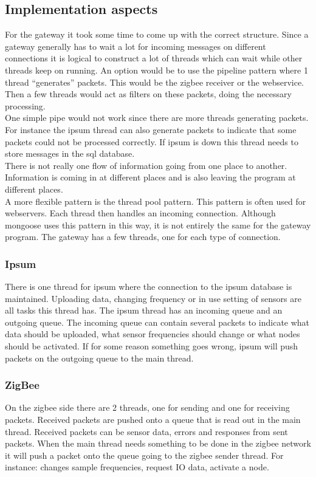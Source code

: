 \subsection{Implementation aspects}
For the gateway it took some time to come up with the correct structure. Since a gateway generally has to wait a lot for incoming messages on different connections it is logical to construct a lot of threads which can wait while other threads keep on running. An option would be to use the pipeline pattern where 1 thread “generates” packets. This would be the zigbee receiver or the webservice. Then a few threads would act as filters on these packets, doing the necessary processing.\\
One simple pipe would not work since there are more threads generating packets. For instance the ipsum thread can also generate packets to indicate that some packets could not be processed correctly. If ipsum is down this thread needs to store messages in the sql database.\\
There is not really one flow of information going from one	 place to another. Information is coming in at different places and is also leaving the program at different places.\\
A more flexible pattern is the thread pool pattern. This pattern is often used for webservers. Each thread then handles an incoming connection. Although mongoose uses this pattern in this way, it is not entirely the same for the gateway program. The gateway has a few threads, one for each type of connection. 
\subsubsection{Ipsum}
There is one thread for ipsum where the connection to the ipsum database is maintained. Uploading data, changing frequency or in use setting of sensors are all tasks this thread has. The ipsum thread has an incoming queue and an outgoing queue. The incoming queue can contain several packets to indicate what data should be uploaded, what sensor frequencies should change or what nodes should be activated. If for some reason something goes wrong, ipsum will push packets on the outgoing queue to the main thread.
\subsubsection{ZigBee}
On the zigbee side there are 2 threads, one for sending and one for receiving packets. Received packets are pushed onto a queue that is read out in the main thread. Received packets can be sensor data, errors and responses from sent packets. When the main thread needs something to be done in the zigbee network it will push a packet onto the queue going to the zigbee sender thread. For instance: changes sample frequencies, request IO data, activate a node.
